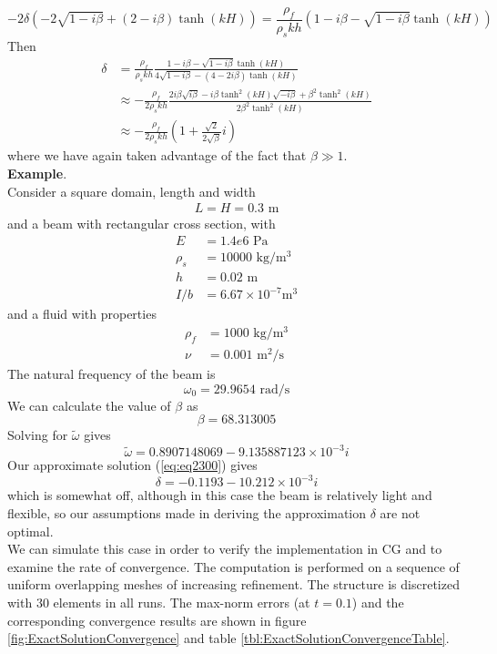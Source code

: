 \documentclass{article}
\begin{document}
\[-2\delta\left(-2\sqrt{1-i\beta}+(2-i\beta)\tanh(kH)\right) = \frac{\rho_f}{\rho_skh}(1-i\beta-\sqrt{1-i\beta}\tanh(kH)) \]
Then 
\begin{align}
\delta  &= \frac{\rho_f}{\rho_skh}\frac{1-i\beta-\sqrt{1-i\beta}\tanh(kH)}{4\sqrt{1-i\beta}-(4-2i\beta)\tanh(kH)} \nonumber \\
        &\approx -\frac{\rho_f}{2\rho_skh} \frac{2i\beta\sqrt{i\beta}-i\beta\tanh^2(kH)\sqrt{-i\beta}+\beta^2 \tanh^2 (kH)}{2\beta^2 \tanh^2 (kH)} \nonumber \\
        &\approx -\frac{\rho_f}{2\rho_skh}\left(1+\frac{\sqrt{2}}{2\sqrt{\beta}}i\right) \label{eq:eq2300}
\end{align}
where we have again taken advantage of the fact that $\beta \gg 1$. \\
{\bf Example}. \\
Consider a square domain, length and width
\begin{align*}
L = H = 0.3 \mbox{ m}
\end{align*}
and a beam with rectangular cross section, with
\begin{align*}
E &= 1.4e6 \mbox{ Pa} \\
\rho_s &= 10000 \mbox { kg/m$^3$}\\
h &= 0.02 \mbox { m} \\
I/b &= 6.67 \times 10^{-7} \mbox {m$^3$}
\end{align*}
and a fluid with properties
\begin{align*}
\rho_f &= 1000 \mbox { kg/m$^3$}\\
\nu &= 0.001 \mbox { m$^2$/s}
\end{align*}
The natural frequency of the beam is 
\[ \omega_0 = 29.9654 \mbox { rad/s} \]
We can calculate the value of $\beta$ as 
\[ \beta = 68.313005 \]
Solving for $\tilde{\omega}$ gives
\[ \tilde{\omega} =  0.8907148069 - 9.135887123 \times 10^{-3}i \]
Our approximate solution (\ref{eq:eq2300}) gives
\[ \delta = -0.1193 - 10.212 \times 10^{-3} i \]
which is somewhat off, although in this case the beam is relatively light and flexible, so our assumptions made in deriving the approximation $\delta$ are not optimal. \\
We can simulate this case in order to verify the implementation in CG and to examine the rate of convergence.  
The computation is performed on a sequence of uniform overlapping meshes of increasing refinement. 
The structure is discretized with $30$ elements in all runs. 
The max-norm errors (at $t=0.1$) and the corresponding convergence results are shown in figure \ref{fig:ExactSolutionConvergence} and table \ref{tbl:ExactSolutionConvergenceTable}.
\end{document}
